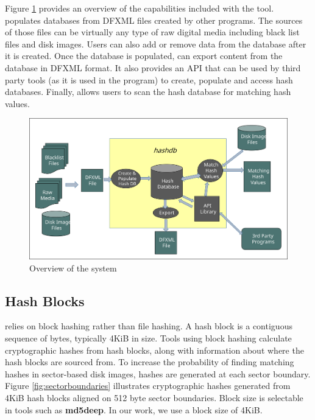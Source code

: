 \documentclass[11pt,fleqn]{article} %
\begin{document}
Figure \ref{fig:overviewFigure} provides an overview of the capabilities included with the \hash tool. \hash populates databases from DFXML files created by other programs. The sources of those files can be virtually any type of raw digital media including black list files and disk images. Users can also add or remove data from the database after it is created. Once the database is populated, \hash can export content from the database in DFXML format. It also provides an API that can be used by third party tools (as it is used in the \bulk program) to create, populate and access hash databases. Finally, \hash allows users to scan the hash database for matching hash values.\\
\begin{figure}
	\center
	\includegraphics[scale=.45]{drawings/hashdb_system_overview}
	\caption{Overview of the \hash system}
	\label{fig:overviewFigure}
\end{figure}

\subsection{Hash Blocks}
\label{HashBlocks}
\hash relies on block hashing rather than file hashing. A hash block is a contiguous sequence of bytes, typically 4KiB in size. Tools using block hashing calculate cryptographic hashes from hash blocks, along with information about where the hash blocks are sourced from. To increase the probability of finding matching hashes in sector-based disk images, hashes are generated at each sector boundary. Figure \ref{fig:sectorboundaries} illustrates cryptographic hashes generated from 4KiB hash blocks aligned on 512 byte sector boundaries. Block size is selectable in tools such as \textbf{md5deep}. In our work, we use a block size of 4KiB.\\
\end{document}
